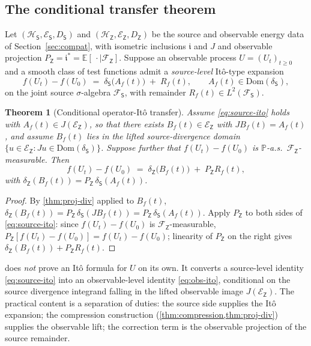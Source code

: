 \documentclass[11pt,reqno]{amsart}
\theoremstyle{plain}
\newtheorem{theorem}{Theorem}[section]
\theoremstyle{definition}
\theoremstyle{remark}
\newcommand{\E}{\mathbb{E}}
\newcommand{\Prob}{\mathbb{P}}
\newcommand{\Hilb}{\mathcal{H}}
\newcommand{\Dom}{\mathrm{Dom}}
\newcommand{\Energy}{\mathcal{E}}
\newcommand{\Source}{\mathsf{S}}
\newcommand{\Obs}{\mathsf{Z}}
\renewcommand{\iota}{\mathfrak{i}}
\begin{document}
\subsection*{The conditional transfer theorem}

Let $(\Hilb_\Source,\Energy_\Source,D_\Source)$ and
$(\Hilb_\Obs,\Energy_\Obs,D_\Obs)$ be the source and observable energy
data of Section~\ref{sec:compat}, with isometric inclusions $\iota$ and
$J$ and observable projection $P_\Obs=\iota^*=\E[\,\cdot\mid\mathcal F_\Obs]$.
Suppose an observable process $U=(U_t)_{t\ge 0}$ and a smooth class of
test functions admit a \emph{source-level} It\^o-type expansion
\begin{equation}\label{eq:source-ito}
  f(U_t)-f(U_0)\;=\;\delta_\Source\bigl(A_f(t)\bigr)\;+\;R_f(t),
  \qquad A_f(t)\in\Dom(\delta_\Source),
\end{equation}
on the joint source $\sigma$-algebra $\mathcal F_\Source$, with
remainder $R_f(t)\in L^{2}(\mathcal F_\Source)$.

\begin{theorem}[Conditional operator-It\^o transfer]\label{thm:transfer}
Assume \eqref{eq:source-ito} holds with $A_f(t)\in J(\Energy_\Obs)$,
so that there exists $B_f(t)\in\Energy_\Obs$ with $JB_f(t)=A_f(t)$, and
assume $B_f(t)$ lies in the lifted source-divergence domain
$\{u\in\Energy_\Obs:Ju\in\Dom(\delta_\Source)\}$. Suppose further that
$f(U_t)-f(U_0)$ is $\Prob$-a.s.\ $\mathcal F_\Obs$-measurable. Then
\begin{equation}\label{eq:obs-ito}
  f(U_t)-f(U_0)\;=\;\delta_\Obs\bigl(B_f(t)\bigr)\;+\;P_\Obs R_f(t),
\end{equation}
with $\delta_\Obs(B_f(t))=P_\Obs\,\delta_\Source(A_f(t))$.
\end{theorem}

\begin{proof}
By \cref{thm:proj-div} applied to $B_f(t)$,
$\delta_\Obs(B_f(t))=P_\Obs\,\delta_\Source(JB_f(t))
=P_\Obs\,\delta_\Source(A_f(t))$. Apply $P_\Obs$ to both sides of
\eqref{eq:source-ito}: since $f(U_t)-f(U_0)$ is
$\mathcal F_\Obs$-measurable, $P_\Obs[f(U_t)-f(U_0)]=f(U_t)-f(U_0)$;
linearity of $P_\Obs$ on the right gives
$\delta_\Obs(B_f(t))+P_\Obs R_f(t)$.
\end{proof}

 does \emph{not} prove an It\^o formula for $U$ on
its own. It converts a source-level identity \eqref{eq:source-ito}
into an observable-level identity \eqref{eq:obs-ito}, conditional on
the source divergence integrand falling in the lifted observable image
$J(\Energy_\Obs)$. The practical content is a separation of duties:
the source side supplies the It\^o expansion; the compression
construction (\cref{thm:compression,thm:proj-div}) supplies the
observable lift; the correction term is the observable projection of
the source remainder.
\end{document}
